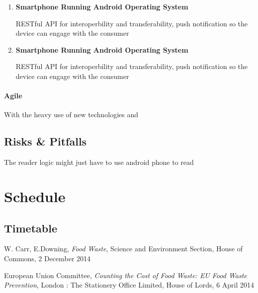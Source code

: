 \documentclass[a4paper, 11pt]{article}
\begin{document}
{\begin{enumerate}
   \item \textbf{Smartphone Running Android Operating System}
   	\begin{flushleft}RESTful API for interoperbility and transferability, push notification so the device can engage with the consumer
  	\end{flushleft}
	
   \item \textbf{Smartphone Running Android Operating System}
   	\begin{flushleft}RESTful API for interoperbility and transferability, push notification so the device can engage with the consumer
  	\end{flushleft}
\end{enumerate}



\paragraph{Agile}With the heavy use of new technologies and


\subsection{Risks \& Pitfalls}
The 
reader logic might just have to use android phone to read

\clearpage

\section{Schedule}
\subsection{Timetable}

\clearpage


\begin{thebibliography}{15}

W. Carr, E.Downing, \emph{Food Waste}, Science and Environment Section, House of Commons, 2 December 2014
\vspace{\baselineskip}

European Union Committee, \emph{Counting the Cost of Food Waste: EU Food Waste Prevention}, London : The Stationery Office Limited, House of Lords, 6 April 2014
\vspace{\baselineskip}


\end{thebibliography}}
\end{document}
